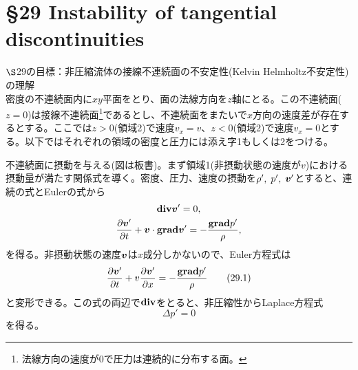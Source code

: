 \documentclass[11pt,a4paper]{jsarticle}
\def\vec#1{\mbox{\boldmath $#1$}}
\begin{document}
\section*{\S29 Instability of tangential discontinuities}
$\S$29の目標：非圧縮流体の接線不連続面の不安定性(Kelvin Helmholtz不安定性)の理解
\\

密度の不連続面内に$xy$平面をとり、面の法線方向を$z$軸にとる。この不連続面($z=0$)は接線不連続面\footnote{法線方向の速度が0で圧力は連続的に分布する面。}であるとし、不連続面をまたいで$x$方向の速度差が存在するとする。ここでは$z>0$(領域2)で速度$v_x=v$、$z<0$(領域2)で速度$v_x=0$とする。以下ではそれぞれの領域の密度と圧力には添え字1もしくは2をつける。

不連続面に摂動を与える(図は板書)。まず領域1(非摂動状態の速度が$v$)における摂動量が満たす関係式を導く。密度、圧力、速度の摂動を$\rho',\;p',\;\vec{v}'$とすると、連続の式とEulerの式から
\begin{gather}
\vec{\mathrm{div}}\vec{v}'=0,\\
\frac{\partial \vec{v}'}{\partial t}+\vec{v}\cdot\vec{\mathrm{grad}}\vec{v}'=-\frac{\vec{\mathrm{grad}}p'}{\rho},
\end{gather}
を得る。非摂動状態の速度$\vec{v}$は$x$成分しかないので、Euler方程式は
\begin{equation}
\frac{\partial \vec{v}'}{\partial t}+v\frac{\partial\vec{v}'}{\partial x}=-\frac{\vec{\mathrm{grad}}p'}{\rho}\tag{29.1}
\end{equation}
と変形できる。この式の両辺で$\vec{\mathrm{div}}$をとると、非圧縮性からLaplace方程式
\begin{equation}
\Delta p'=0\tag{29.2}
\end{equation}
を得る。
\end{document}
